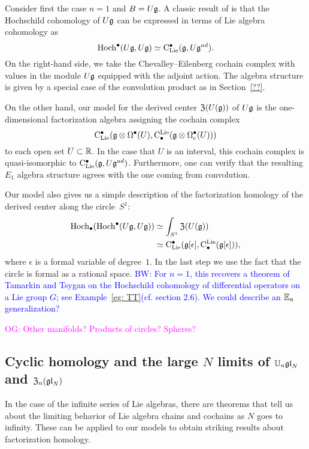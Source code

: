 \documentclass[11pt]{amsart}
\numberwithin{equation}{section}
\def\brian{\textcolor{blue}{BW: }\textcolor{blue}}
\def\owen{\textcolor{magenta}{OG: }\textcolor{magenta}}
\begin{document}
Consider first the case $n=1$ and $B = U \mathfrak g$. 
A classic result of \cite{HochSerre} is that the Hochschild cohomology of $U \mathfrak g$ can be expressed in terms of Lie algebra cohomology as 
\[
{\rm Hoch}^\bullet(U\mathfrak g,U\mathfrak g) \simeq {\rm C}_{\rm Lie}^\bullet(\mathfrak g, U\mathfrak g^{ad}).
\] 
On the right-hand side, we take the Chevalley--Eilenberg cochain complex with values in the module $U \mathfrak g$ equipped with the adjoint action.
The algebra structure is given by a special case of the convolution product as in Section~\ref{??}. 

On the other hand, our model for the derived center ${\frak Z}(U(\mathfrak g))$ of $U \mathfrak g$ is the one-dimensional factorization algebra assigning the cochain complex
\[
{\rm C}_{\rm Lie}^\bullet(\mathfrak g \otimes \Omega^\bullet(U), {\rm C}^{\rm Lie}_\bullet( \mathfrak g \otimes \Omega^\bullet_c(U)))
\]
to each open set $U \subset \mathbb R$.
In the case that $U$ is an interval, this cochain complex is quasi-isomorphic to ${\rm C}_{\rm Lie}^\bullet (\mathfrak g , U\mathfrak g^{ad})$.
Furthermore, one can verify that the resulting $E_1$ algebra structure agrees with the one coming from convolution. 

Our model also gives us a simple description of the factorization homology of the derived center along the circle~$S^1$:
\begin{align*}
{\rm Hoch}_\bullet({\rm Hoch}^\bullet(U \mathfrak g, U\mathfrak g)) 
&\simeq \int_{S^1} {\frak Z}(U(\mathfrak g)) \\
&\simeq {\rm C}_{\rm Lie}^\bullet(\mathfrak g[\epsilon], {\rm C}^{\rm Lie}_\bullet( \mathfrak g[\epsilon])),
\end{align*}
where $\epsilon$ is a formal variable of degree~$1$. 
In the last step we use the fact that the circle is formal as a rational space.
\brian{For $n=1$, this recovers a theorem of Tamarkin and Tsygan \cite{TT} on the Hochschild cohomology of differential operators on a Lie group $G$;
see Example~\ref{eg: TT}(cf. section 2.6).
We could describe an $\mathbb E_n$ generalization?}

\owen{Other manifolds? Products of circles? Spheres?}

\subsection{Cyclic homology and the large $N$ limits of $\mathbb U_n {\mathfrak{gl}}_N$ and ${\frak Z}_n({\mathfrak{gl}}_N)$}

In the case of the infinite series of Lie algebras, 
there are theorems that tell us about the limiting behavior of Lie algebra chains and cochains as $N$ goes to infinity.
These can be applied to our models to obtain striking results about factorization homology.

\def\Dih{{\rm Dih}}
\end{document}
